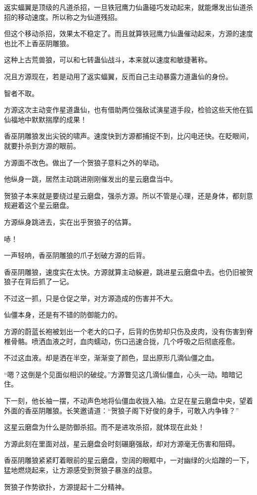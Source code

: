 \begin{this_body}
返实蝠翼是顶级的凡道杀招，一旦铁冠鹰力仙蛊碰巧发动起来，就能爆发出仙道杀招的移动速度。所以称之为仙道残招。

但这个移动杀招，效果太不稳定了。而且就算铁冠鹰力仙蛊催动起来，方源的速度也比不上香巫阴雕狼。

这种上古荒兽狼，可以和七转蛊仙战斗，本来就以速度和敏捷著称。

况且方源现在，若是动用了返实蝠翼，反而自己主动暴露力道蛊仙的身份。

智者不取。

方源这次主动变作星道蛊仙，也有借助两位强敌试演星道手段，检验这些天他在狐仙福地中默默揣摩的成果！

香巫阴雕狼发出尖锐的啸声。速度快到方源都捕捉不到，比闪电还快。在眨眼间，就要扑杀到方源的眼前。

方源面不改色。做出了一个贺狼子意料之外的举动。

他纵身一跳，居然主动跳进刚刚催发出的星云磨盘当中。

贺狼子本来就是要绕过星云磨盘，强杀方源。所以不管是心理，还是身体，都刻意规避着这个星云磨盘。

方源纵身跳进去，实在出乎贺狼子的估算。

哧！

一声轻响，香巫阴雕狼的爪子划破方源的后背。

香巫阴雕狼，速度实在太快。方源就算主动躲避，跳进星云磨盘中去。也仍旧被贺狼子在背后抓了一记。

不过这一抓，只是仓促之举，对方源造成的伤害并不大。

仙僵本身，还是有不错的防御能力的。

方源的蔚蓝长袍被划出一个老大的口子，后背的伤势却只伤及皮肉，没有伤害到脊椎骨骼。喷洒血液之时，血肉蠕动，伤口迅速合拢，几个呼吸之后彻底痊愈。

不过这血液。却是洒在半空，渐渐变了颜色，显出原形几滴仙僵之血。

“嗯？这倒是个见面似相识的破绽。”方源瞥见这几滴仙僵血，心头一动。暗暗记住。

下一刻，他长袖一摆，不动声色地将仙僵血收拢入袖。立足在星云磨盘中央，望着外面的香巫阴雕狼。长笑邀请道：“贺狼子阁下好俊的身手，可敢入内争锋？”

这星云磨盘为什么是防御杀招。而不是进攻杀招，就体现在此处！

方源此刻在里面对战，星云磨盘会时刻碾磨强敌，却对方源毫无伤害和阻碍。

香巫阴雕狼紧紧盯着眼前的星云磨盘，空阔的眼眶中，一对幽绿的火焰蹭的一下，猛地燃烧起来，让方源感受到贺狼子暴涨的战意。

贺狼子作势欲扑，方源提起十二分精神。


\end{this_body}

